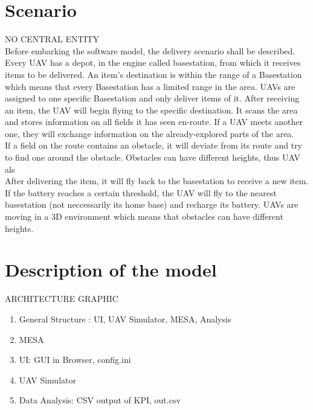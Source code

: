 \section{Scenario}
NO CENTRAL ENTITY
\\
Before embarking the software model, the delivery scenario shall be described.  Every UAV has a depot, in the engine called basestation, from which it receives items to be delivered. An item's destination is within the range of a Basestation which means that every Basestation has a limited range in the area. UAVs are assigned to one specific Basestation and only deliver items of it. After receiving an item, the UAV will begin flying to the specific destination. It scans the area and stores information on all fields it has seen en-route. If a UAV meets another one, they will exchange information on the already-explored parts of the area.\\
If a field on the route contains an obstacle, it will deviate from its route and try to find one around the obstacle. Obstacles can have different heights, thus UAV als\\
After delivering the item, it will fly back to the basestation to receive a new item. If the battery reaches a certain threshold, the UAV will fly to the nearest basestation (not neccessarily its home base) and recharge its battery. 
 UAVs are moving in a 3D environment which means that obstacles can have different heights.

\section{Description of the model}
ARCHITECTURE GRAPHIC
\begin{enumerate}
	\item General Structure :  UI, UAV Simulator, MESA, Analysis
	\item MESA
	\item UI: GUI in Browser, config.ini
	\item UAV Simulator
	\item Data Analysis: CSV output of KPI, out.csv
\end{enumerate}

